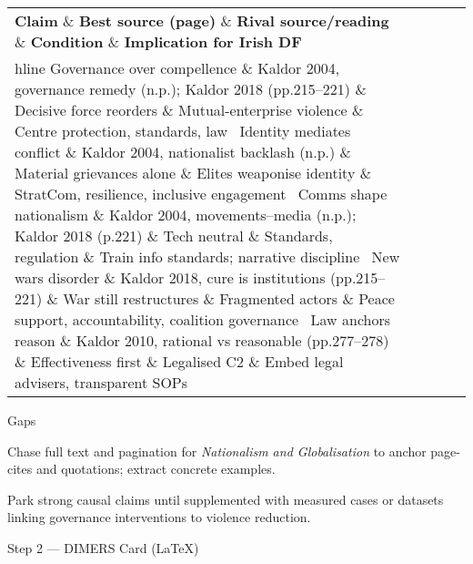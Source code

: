 \begin{tabular}{p{3.2cm}p{4.2cm}p{3.6cm}p{3.2cm}p{4.2cm}}
	\textbf{Claim} \& \textbf{Best source (page)} \& \textbf{Rival source/reading} \& \textbf{Condition} \& \textbf{Implication for Irish DF}\\hline
	Governance over compellence \& Kaldor 2004, governance remedy (n.p.); Kaldor 2018 (pp.215–221) \& Decisive force reorders \& Mutual-enterprise violence \& Centre protection, standards, law \
	Identity mediates conflict \& Kaldor 2004, nationalist backlash (n.p.) \& Material grievances alone \& Elites weaponise identity \& StratCom, resilience, inclusive engagement \
	Comms shape nationalism \& Kaldor 2004, movements–media (n.p.); Kaldor 2018 (p.221) \& Tech neutral \& Standards, regulation \& Train info standards; narrative discipline \
	New wars disorder \& Kaldor 2018, cure is institutions (pp.215–221) \& War still restructures \& Fragmented actors \& Peace support, accountability, coalition governance \
	Law anchors reason \& Kaldor 2010, rational vs reasonable (pp.277–278) \& Effectiveness first \& Legalised C2 \& Embed legal advisers, transparent SOPs \
\end{tabular}

Gaps

Chase full text and pagination for \textit{Nationalism and Globalisation} to anchor page-cites and quotations; extract concrete examples.

Park strong causal claims until supplemented with measured cases or datasets linking governance interventions to violence reduction.

\parencite{KALDOR_2014}

Step 2 — DIMERS Card (LaTeX)

